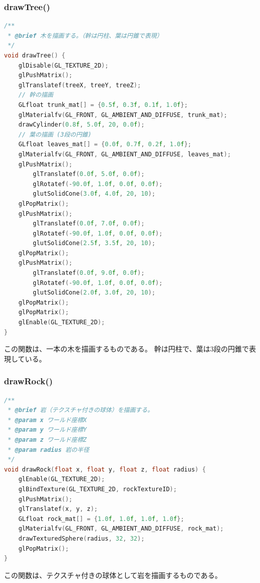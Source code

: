 \documentclass[uplatex,dvipdfmx,a4paper]{jsarticle}
\begin{document}
\hypertarget{func:drawTree}{}\subsubsection{drawTree()}\label{func:drawTree}
\begin{lstlisting}[language=C++, caption={drawTree() 関数}, label={lst:drawTree_detail}]
/**
 * @brief 木を描画する。（幹は円柱、葉は円錐で表現）
 */
void drawTree() {
    glDisable(GL_TEXTURE_2D);
    glPushMatrix();
    glTranslatef(treeX, treeY, treeZ);
    // 幹の描画
    GLfloat trunk_mat[] = {0.5f, 0.3f, 0.1f, 1.0f};
    glMaterialfv(GL_FRONT, GL_AMBIENT_AND_DIFFUSE, trunk_mat);
    drawCylinder(0.8f, 5.0f, 20, 0.0f);
    // 葉の描画 (3段の円錐)
    GLfloat leaves_mat[] = {0.0f, 0.7f, 0.2f, 1.0f};
    glMaterialfv(GL_FRONT, GL_AMBIENT_AND_DIFFUSE, leaves_mat);
    glPushMatrix();
        glTranslatef(0.0f, 5.0f, 0.0f);
        glRotatef(-90.0f, 1.0f, 0.0f, 0.0f);
        glutSolidCone(3.0f, 4.0f, 20, 10);
    glPopMatrix();
    glPushMatrix();
        glTranslatef(0.0f, 7.0f, 0.0f);
        glRotatef(-90.0f, 1.0f, 0.0f, 0.0f);
        glutSolidCone(2.5f, 3.5f, 20, 10);
    glPopMatrix();
    glPushMatrix();
        glTranslatef(0.0f, 9.0f, 0.0f);
        glRotatef(-90.0f, 1.0f, 0.0f, 0.0f);
        glutSolidCone(2.0f, 3.0f, 20, 10);
    glPopMatrix();
    glPopMatrix();
    glEnable(GL_TEXTURE_2D);
}
\end{lstlisting}
この関数は、一本の木を描画するものである。
幹は円柱で、葉は3段の円錐で表現している。

\hypertarget{func:drawRock}{}\subsubsection{drawRock()}\label{func:drawRock}
\begin{lstlisting}[language=C++, caption={drawRock() 関数}, label={lst:drawRock_detail}]
/**
 * @brief 岩（テクスチャ付きの球体）を描画する。
 * @param x ワールド座標X
 * @param y ワールド座標Y
 * @param z ワールド座標Z
 * @param radius 岩の半径
 */
void drawRock(float x, float y, float z, float radius) {
    glEnable(GL_TEXTURE_2D);
    glBindTexture(GL_TEXTURE_2D, rockTextureID);
    glPushMatrix();
    glTranslatef(x, y, z);
    GLfloat rock_mat[] = {1.0f, 1.0f, 1.0f, 1.0f};
    glMaterialfv(GL_FRONT, GL_AMBIENT_AND_DIFFUSE, rock_mat);
    drawTexturedSphere(radius, 32, 32);
    glPopMatrix();
}
\end{lstlisting}
この関数は、テクスチャ付きの球体として岩を描画するものである。
\end{document}
